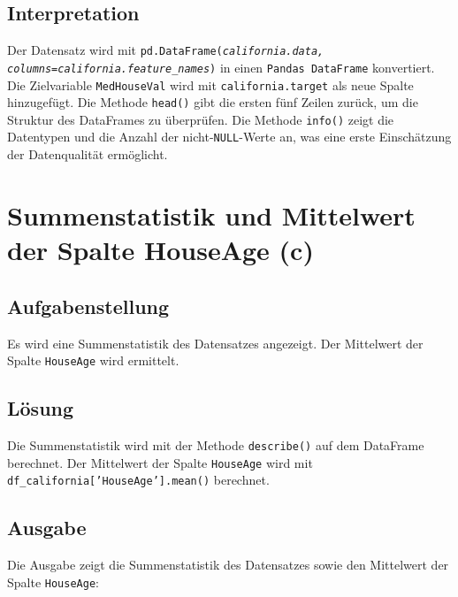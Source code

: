 \subsection{Interpretation}

Der Datensatz wird mit \texttt{pd.DataFrame(\textit{california.data, \\columns=california.feature\_names})} in einen \texttt{Pandas DataFrame} konvertiert. Die Zielvariable \texttt{MedHouseVal} wird mit \texttt{california.target} als neue Spalte hinzugefügt. Die Methode \texttt{head()} gibt die ersten fünf Zeilen zurück, um die Struktur des DataFrames zu überprüfen. Die Methode \texttt{info()} zeigt die Datentypen und die Anzahl der nicht-\texttt{NULL}-Werte an, was eine erste Einschätzung der Datenqualität ermöglicht.

\cleardoublepage


\section{Summenstatistik und Mittelwert der Spalte HouseAge (c)}
\label{sec:2c}

\subsection{Aufgabenstellung}

Es wird eine Summenstatistik des Datensatzes angezeigt. Der Mittelwert der Spalte \texttt{HouseAge} wird ermittelt.

\subsection{Lösung}

Die Summenstatistik wird mit der Methode \texttt{describe()} auf dem DataFrame berechnet. Der Mittelwert der Spalte \texttt{HouseAge} wird mit \texttt{df\_california['HouseAge'].mean()} berechnet.



\subsection{Ausgabe}

Die Ausgabe zeigt die Summenstatistik des Datensatzes sowie den Mittelwert der Spalte \texttt{HouseAge}:

